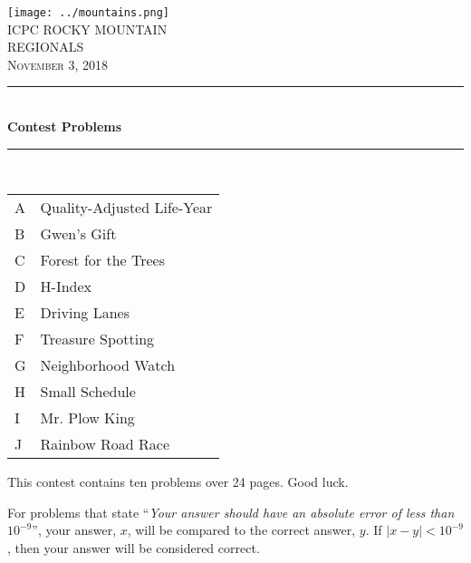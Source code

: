 \documentclass[letterpaper,11pt,noproblemids]{../problemset}
\newcommand{\HRule}{\rule{\linewidth}{0.5mm}}
\begin{document}
\thispagestyle{empty}
\begin{center}
\vspace*{\fill}
\texttt{[image: ../mountains.png]} \\

\textsc{\Huge ICPC ROCKY MOUNTAIN \\[0.3cm] REGIONALS}\\[0.5cm]

\textsc{\Large November 3, 2018}\\[0.3cm]

\HRule \\[0.3cm]

{ \huge \bfseries Contest Problems \\[0.3cm] }

\HRule \\[0.5cm]

{\large
\begin{tabular}{l@{:\hskip4pt}l}
A & Quality-Adjusted Life-Year \\
B & Gwen’s Gift \\
C & Forest for the Trees \\
D & H-Index \\
E & Driving Lanes \\
F & Treasure Spotting \\
G & Neighborhood Watch \\
H & Small Schedule \\
I & Mr. Plow King \\
J & Rainbow Road Race \\
\end{tabular}
}
\vspace*{\fill}
\end{center}

\clearpage

\begin{center}
This contest contains ten problems over 24 pages. Good luck.
\end{center}

\vskip 20pt

For problems that state ``\textit{Your answer should have an absolute error of less than $10^{-9}$}'', your answer, $x$, will be compared to the correct answer, $y$. If $|x-y| < 10^{-9}$, then your answer will be considered correct.
\end{document}
